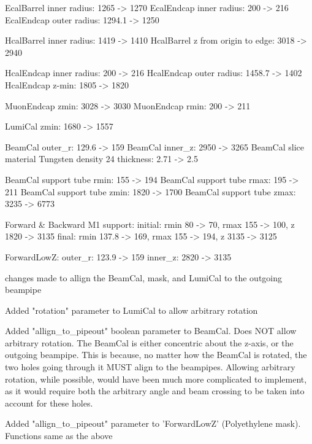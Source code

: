\documentclass{report}
\begin{document}
            EcalBarrel inner radius: 1265 -> 1270
            EcalEndcap inner radius: 200 -> 216
            EcalEndcap outer radius: 1294.1 -> 1250

            HcalBarrel inner radius: 1419 -> 1410
            HcalBarrel z from origin to edge: 3018 -> 2940

            HcalEndcap inner radius: 200 -> 216
            HcalEndcap outer radius: 1458.7 -> 1402
            HcalEndcap z-min: 1805 -> 1820

            MuonEndcap zmin: 3028 -> 3030
            MuonEndcap rmin: 200 -> 211

            LumiCal zmin: 1680 -> 1557

            BeamCal outer_r: 129.6 -> 159
            BeamCal inner_z: 2950 -> 3265
            BeamCal slice material Tungsten density 24 thickness: 2.71 -> 2.5
            
            BeamCal support tube rmin: 155 -> 194
            BeamCal support tube rmax: 195 -> 211
            BeamCal support tube zmin: 1820 -> 1700
            BeamCal support tube zmax: 3235 -> 6773

            Forward & Backward M1 support:
                initial: rmin 80 -> 70, rmax 155 -> 100, z 1820 -> 3135
                final:   rmin 137.8 -> 169, rmax 155 -> 194, z 3135 -> 3125

            ForwardLowZ:
                outer_r: 123.9 -> 159
                inner_z: 2820 -> 3135



        changes made to allign the BeamCal, mask, and LumiCal to the outgoing beampipe

            Added "rotation" parameter to LumiCal to allow arbitrary rotation

            Added "allign_to_pipeout" boolean parameter to BeamCal. 
                Does NOT allow arbitrary rotation. The BeamCal is either concentric 
                about the z-axis, or the outgoing beampipe. This is because, no matter
                how the BeamCal is rotated, the two holes going through it MUST align 
                to the beampipes. Allowing arbitrary rotation, while possible, would
                have been much more complicated to implement, as it would require both
                the arbitrary angle and beam crossing to be taken into account for 
                these holes.

            Added "allign_to_pipeout" parameter to 'ForwardLowZ' (Polyethylene mask).
                Functions same as the above 
\end{document}
